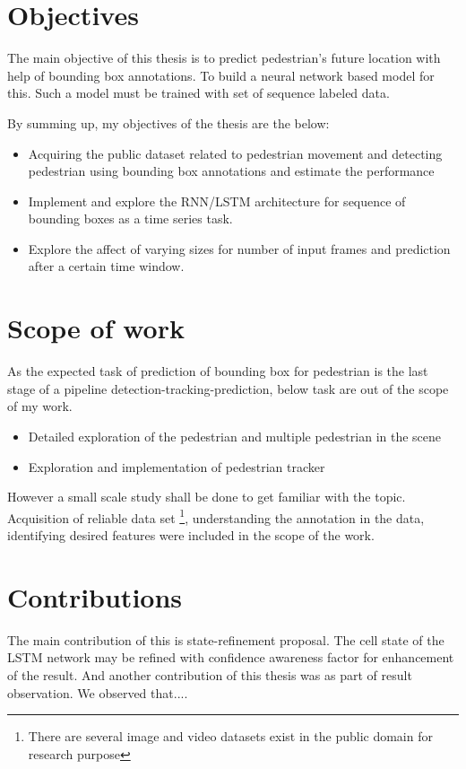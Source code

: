 \section{Objectives}
\newpara The main objective of this thesis is to predict pedestrian's future location with help of bounding box annotations. To build a neural network based model for this. Such a model must be trained with set of sequence labeled data.

By summing up, my objectives of the thesis are the below:
\begin{itemize}
	\item  Acquiring the public dataset related to pedestrian movement and detecting pedestrian using bounding box annotations and estimate the performance

	\item Implement and explore the RNN/LSTM architecture for sequence of bounding boxes as a time series task.
	\item Explore the affect of varying sizes for number of input frames and prediction after a certain time window.
\end{itemize}

\section{Scope of work}
As the expected task of prediction of bounding box for pedestrian is the last stage of a pipeline detection-tracking-prediction, below task are out of the scope of my work.
\begin{itemize}
	\item Detailed exploration of the pedestrian and multiple pedestrian in the scene
	\item Exploration and implementation of pedestrian tracker
\end{itemize}
However a small scale study shall be done to get familiar with the topic.  Acquisition of reliable data set \footnote{There are several image and video datasets exist in the public domain for research purpose}, understanding the annotation in the data, identifying desired features were included in the scope of the work.

\section{Contributions}
The main contribution of this is state-refinement proposal. The cell state of the LSTM network may be refined with confidence awareness factor for enhancement of the result. And another contribution of this thesis was as part of result observation. We observed that....

